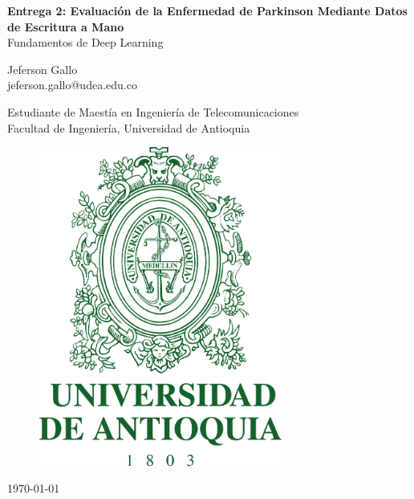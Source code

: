 \documentclass[10pt, a4paper]{article}
\begin{document}
\begin{titlepage}
    \begin{center}
            
        \huge
        \textbf{Entrega 2: Evaluación de la Enfermedad de Parkinson Mediante Datos de Escritura a Mano}\\
        
        \huge
        Fundamentos de Deep Learning
        
        \vspace{1cm}
        Jeferson Gallo\\
        \large
        jeferson.gallo@udea.edu.co

        \vspace{1cm}
        
        \Large
       Estudiante de Maestía en Ingeniería de Telecomunicaciones\\
        Facultad de Ingeniería, Universidad de Antioquia

        \vspace{1.5cm}
        
        \begin{figure}[h!]
            \centering
            \includegraphics[width=8cm]{images/logosimbolo-vertical.png}
        \end{figure}
        
        \vfill
        \Large
        \today
            
    \end{center}
\end{titlepage}
\end{document}
